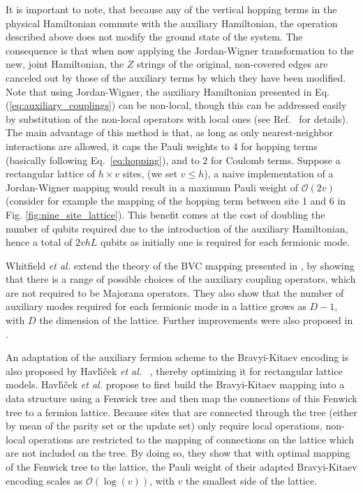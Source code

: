 It is important to note, that because any of the vertical hopping terms in the physical Hamiltonian commute with the auxiliary Hamiltonian, the operation described above does not modify the ground state of the system. The consequence is that when now applying the Jordan-Wigner transformation to the new, joint Hamiltonian, the $Z$ strings of the original, non-covered edges are canceled out by those of the auxiliary terms by which they have been modified. Note that using Jordan-Wigner, the auxiliary Hamiltonian presented in Eq. (\ref{eq:auxiliary_couplings}) can be non-local, though this can be addressed easily by substitution of the non-local operators with local ones (see Ref.~\cite{Verstraete2005} for details).
The main advantage of this method is that, as long as only nearest-neighbor interactions are allowed, it caps the Pauli weights to 4 for hopping terms (basically following Eq.~\ref{eq:hopping}), and to $2$ for Coulomb terms. Suppose a rectangular lattice of $h \times v$ sites, (we set $v \leq h$), a naive implementation of a Jordan-Wigner mapping would result in a maximum Pauli weight of $\mathcal{O}(2v)$ (consider for example the mapping of the hopping term between site 1 and 6 in Fig. \ref{fig:nine_site_lattice}). This benefit comes at the cost of doubling the number of qubits required due to the introduction of the auxiliary Hamiltonian, hence a total of $2vhL$ qubits as initially one is required for each fermionic mode.   

Whitfield {\it et al.} \cite{Whitfield2016} extend the theory of the BVC mapping presented in \cite{Verstraete2005, Ball2005}, by showing that there is a range of possible choices of the auxiliary coupling operators, which are not required to be Majorana operators. They also show that the number of auxiliary modes required for each fermionic mode in a lattice grows as $D - 1$, with $D$ the dimension of the lattice. Further improvements were also proposed in \cite{Steudtner2019}.

An adaptation of the auxiliary fermion scheme to the Bravyi-Kitaev encoding is also proposed by Havl{\'{\i}}{\v{c}}ek {\it et al.} ~\cite{Havlek2017}, thereby optimizing it for rectangular lattice models. Havl{\'{\i}}{\v{c}}ek {\it et al.} propose to first build the Bravyi-Kitaev mapping into a data structure using a Fenwick tree and then map the connections of this Fenwick tree to a fermion lattice. Because sites that are connected through the tree (either by mean of the parity set or the update set) only require local operations, non-local operations are restricted to the mapping of connections on the lattice which are not included on the tree. By doing so, they show that with optimal mapping of the Fenwick tree to the lattice, the Pauli weight of their adapted Bravyi-Kitaev encoding scales as $\mathcal{O}(\log(v))$, with $v$ the smallest side of the lattice. 


